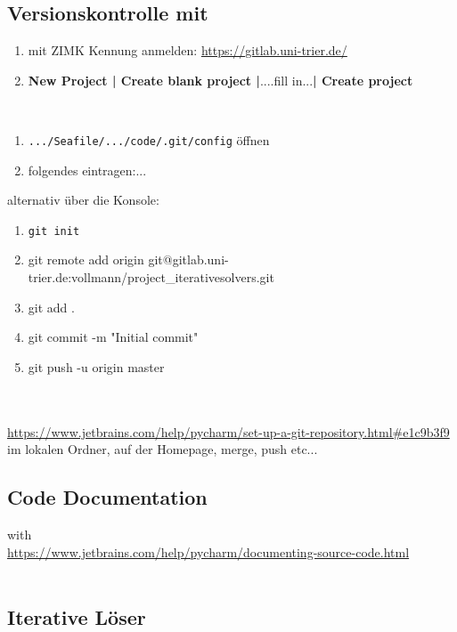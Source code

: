 \subsection{Versionskontrolle mit \git}
\textbf{\gitlab}
\begin{enumerate}
	\item mit ZIMK Kennung anmelden: \url{https://gitlab.uni-trier.de/}
	\item \textbf{New Project | Create blank project |}....fill in...\textbf{| Create project}
\end{enumerate}
~\\
\textbf{\filemanager}
\begin{enumerate}
	\item \texttt{.../Seafile/.../code/.git/config} öffnen
	\item folgendes eintragen:...
\end{enumerate}
alternativ über die Konsole:
\begin{enumerate}
	\item \texttt{git init}
	\item git remote add origin git@gitlab.uni-trier.de:vollmann/project\_iterativesolvers.git
	\item git add .
	\item git commit -m "Initial commit"
	\item git push -u origin master
\end{enumerate}
~\\
\textbf{\pycharm}\\
\url{https://www.jetbrains.com/help/pycharm/set-up-a-git-repository.html#e1c9b3f9}\\
im lokalen Ordner, auf der Homepage, merge, push etc...


\subsection{Code Documentation}
with \textbf{\pycharm}\\
\url{https://www.jetbrains.com/help/pycharm/documenting-source-code.html}
~\\~\\
\subsection{Iterative Löser}
